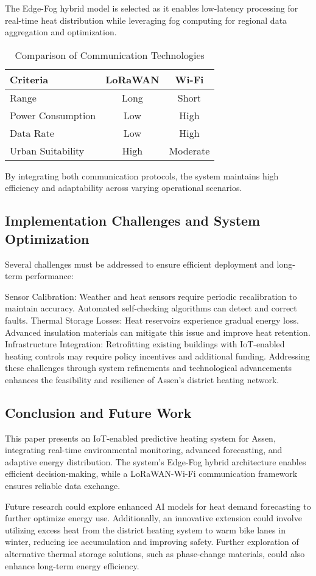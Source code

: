 \documentclass[conference]{IEEEtran}
\begin{document}
The Edge-Fog hybrid model is selected as it enables low-latency processing for real-time heat distribution while leveraging fog computing for regional data aggregation and optimization.

\begin{table}[h]
\centering
\caption{Comparison of Communication Technologies}
\begin{tabular}{|l|c|c|}
\hline
\textbf{Criteria} & \textbf{LoRaWAN} & \textbf{Wi-Fi} \\
\hline
Range & Long & Short \\
Power Consumption & Low & High \\
Data Rate & Low & High \\
Urban Suitability & High & Moderate \\
\hline
\end{tabular}
\end{table}

By integrating both communication protocols, the system maintains high efficiency and adaptability across varying operational scenarios.

\subsection{Implementation Challenges and System Optimization}

Several challenges must be addressed to ensure efficient deployment and long-term performance:

Sensor Calibration: Weather and heat sensors require periodic recalibration to maintain accuracy. Automated self-checking algorithms can detect and correct faults.
Thermal Storage Losses: Heat reservoirs experience gradual energy loss. Advanced insulation materials can mitigate this issue and improve heat retention.
Infrastructure Integration: Retrofitting existing buildings with IoT-enabled heating controls may require policy incentives and additional funding.
Addressing these challenges through system refinements and technological advancements enhances the feasibility and resilience of Assen’s district heating network.

\subsection{Conclusion and Future Work}

This paper presents an IoT-enabled predictive heating system for Assen, integrating real-time environmental monitoring, advanced forecasting, and adaptive energy distribution. The system’s Edge-Fog hybrid architecture enables efficient decision-making, while a LoRaWAN-Wi-Fi communication framework ensures reliable data exchange.

Future research could explore enhanced AI models for heat demand forecasting to further optimize energy use. Additionally, an innovative extension could involve utilizing excess heat from the district heating system to warm bike lanes in winter, reducing ice accumulation and improving safety. Further exploration of alternative thermal storage solutions, such as phase-change materials, could also enhance long-term energy efficiency.



\end{document}
